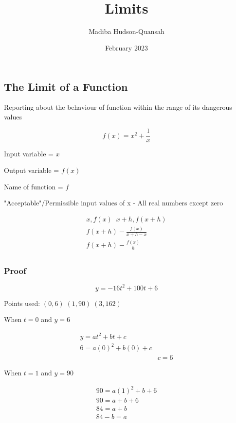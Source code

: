 \documentclass[12pt letter]{report}
\title{\Huge{Limits}}
\author{\huge{Madiba Hudson-Quansah}}
\date{February 2023}
\begin{document}
\maketitle
\newpage
{}
\tableofcontents
\pagebreak

\chapter{}
\section{The Limit of a Function}
Reporting about the behaviour of function within the range of its dangerous values


\begin{displaymath}
	f(x) = x^2 + \frac{1}{x}
\end{displaymath}

Input variable = $x$

Output variable = $f(x)$

Name of function = $f$


"Acceptable"/Permissible input values of x - All real numbers except zero

\begin{gather*}
	x, f(x) \;\; x+h, f(x+h)      \\
	f(x+h) - \frac{f(x)}{x+h-x} \\
	f(x+h) - \frac{f(x)}{h}         \\
\end{gather*}

\subsection{Proof}

\[y = -16t^2+100t+6\]

Points used:
$(0, 6) \; (1, 90) \; (3,162)$

When $t = 0$ and $y = 6$

\begin{align*}
	y = at^2 + bt+c      \\
	6 = a(0)^2 + b(0) +c \\
	 & c = 6
\end{align*}

When $t=1$ and $y=90$

\begin{align*}
	90 = a(1)^2 +b +6 \\
	90 = a + b + 6    \\
	84 = a + b        \\
	84 - b = a
\end{align*}
\end{document}
